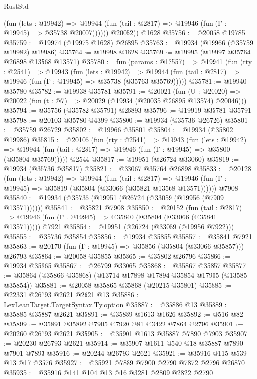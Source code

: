 \begin{lexlean}{RustStd}
\begin{coremodule}
              (fun (lets : @19942) =>
              @19944 (fun (tail : @2817) => @19946 (fun (Γ : @19945) => @35738 @20007))))))
        @20052))
    @1628
@35756 := @20058 @19785
@35759 := @19974 (@19975 @1628) @26895
@35763 := @19934 (@19966 (@35759 @19982) @19986)
@35764 := @19998 @1628
@35769 := @19995 (@19997 @35764 @26898 @13568 @13571)
@35780 := fun (params : @13557) =>
  @19941
    (fun (rty : @2541) =>
    @19943
      (fun (lets : @19942) =>
      @19944 (fun (tail : @2817) => @19946 (fun (Γ : @19945) => @35738 (@35763 @35769)))))
@35781 := @19940 @35780
@35782 := @19938 @35781
@35791 := @20021
    (fun (U : @20020) => @20022 (fun (t : @7) => @20029 (@19934 (@20035 @26895 @13574) @20046)))
@35794 := @35756 (@35782 @35791) @26893
@35796 := @19919 @35781 @35791
@35798 := @20103 @35780 @4399
@35800 := @19934 (@35736 @26726)
@35801 := @35759 @26729
@35802 := @19966 @35801
@35804 := @19934 (@35802 @19986)
@35815 := @20106
    (fun (rty : @2541) =>
    @19943
      (fun (lets : @19942) =>
      @19944 (fun (tail : @2817) => @19946 (fun (Γ : @19945) => @35800 (@35804 @35769)))))
    @2544
@35817 := @19951 (@26724 @33060)
@35819 := @19934 (@35736 @35817)
@35821 := @33067 @35764 @26898
@35833 := @20128
    (fun (lets : @19942) =>
    @19944
      (fun (tail : @2817) =>
      @19946 (fun (Γ : @19945) => @35819 (@35804 (@33066 (@35821 @13568 @13571))))))
    @7908
@35840 := @19934 (@35736 (@19951 (@26724 (@33059 (@19956 (@7909 @13571))))))
@35841 := @35821 @7908
@35850 := @20152
    (fun (tail : @2817) => @19946 (fun (Γ : @19945) => @35840 (@35804 (@33066 (@35841 @13571)))))
    @7921
@35854 := @19951 (@26724 (@33059 (@19956 @7922)))
@35855 := @35736 @35854
@35856 := @19934 @35855
@35857 := @35841 @7921
@35863 := @20170 (fun (Γ : @19945) => @35856 (@35804 (@33066 @35857))) @26793
@35864 := @20058 @35855
@35865 := @35802 @26796
@35866 := @19934 @35865
@35867 := @26799 @33065
@35868 := @35867 @35857
@35877 := @35864 (@35866 @35868) (@13714 @17898 @17894 @35854 @17905 (@13585 @35854))
@35881 := @20058 @35865 @35868 (@20215 @35801)
@35885 := @22331 @26793 @2621 @2621 @13
@35886 := LexLeanTarget.TargetSyntax.Ty.option
@35887 := @35886 @13
@35889 := @35885 @35887 @2621
@35891 := @35889 @1613 @1626
@35892 := @516 @82
@35899 := @35891 @35892 @7905 @7920 @81 @3422 @7864 @2796
@35901 := @20260 @26793 @2621
@35905 := @35901 @1613 @35887 @7890 @7903
@35907 := @20230 @26793 @2621
@35914 := @35907 @1611 @540 @18 @35887 @7890 @7901 @7893
@35916 := @20244 @26793 @2621
@35921 := @35916 @115 @539 @13 @17 @3576
@35927 := @35921 @7889 @7900 @2790 @7872 @2796 @26870
@35935 := @35916 @141 @104 @13 @16 @3281 @2809 @2822 @2790

\end{coremodule}
\end{lexlean}
